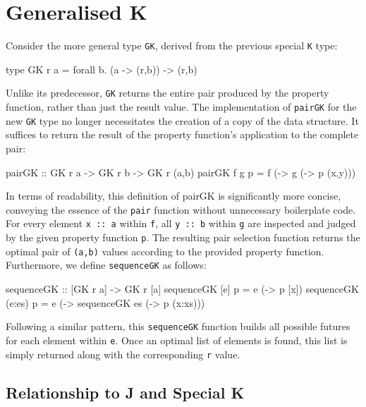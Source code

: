 \documentclass[runningheads]{llncs}
\begin{document}
\section{Generalised K}\label{generalised-k}

Consider the more general type \texttt{GK}, derived from the previous
special \texttt{K} type:

\begin{code}
type GK r a = forall b. (a -> (r,b)) -> (r,b)
\end{code}

Unlike its predecessor, \texttt{GK} returns the entire pair produced by
the property function, rather than just the result value. The
implementation of \texttt{pairGK} for the new \texttt{GK} type no longer
necessitates the creation of a copy of the data structure. It suffices
to return the result of the property function's application to the
complete pair:

\begin{code}
pairGK :: GK r a -> GK r b -> GK r (a,b)
pairGK f g p = f (\x -> g (\y -> p (x,y)))
\end{code}

In terms of readability, this definition of pairGK is significantly more
concise, conveying the essence of the \texttt{pair} function without
unnecessary boilerplate code. For every element \texttt{x\ ::\ a} within
\texttt{f}, all \texttt{y\ ::\ b} within \texttt{g} are inspected and
judged by the given property function \texttt{p}. The resulting pair
selection function returns the optimal pair of \texttt{(a,b)} values
according to the provided property function. Furthermore, we define
\texttt{sequenceGK} as follows:

\begin{code}
sequenceGK :: [GK r a] -> GK r [a]
sequenceGK [e] p    = e (\x -> p [x])
sequenceGK (e:es) p = e (\x -> sequenceGK es (\xs -> p (x:xs)))
\end{code}

Following a similar pattern, this \texttt{sequenceGK} function builds
all possible futures for each element within \texttt{e}. Once an optimal
list of elements is found, this list is simply returned along with the
corresponding \texttt{r} value.

\subsection{Relationship to J and Special
K}\label{relationship-to-j-and-special-k}
\end{document}
